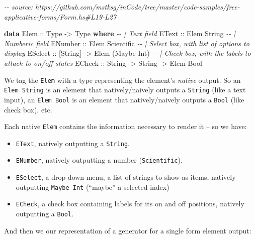 \documentclass[]{article}
\newenvironment{Shaded}{}{}
\newcommand{\CommentTok}[1]{\textcolor[rgb]{0.38,0.63,0.69}{\textit{#1}}}
\newcommand{\DataTypeTok}[1]{\textcolor[rgb]{0.56,0.13,0.00}{#1}}
\newcommand{\KeywordTok}[1]{\textcolor[rgb]{0.00,0.44,0.13}{\textbf{#1}}}
\newcommand{\NormalTok}[1]{#1}
\newcommand{\OtherTok}[1]{\textcolor[rgb]{0.00,0.44,0.13}{#1}}
\begin{document}
\begin{Shaded}
\begin{Highlighting}[]
\CommentTok{{-}{-} source: https://github.com/mstksg/inCode/tree/master/code{-}samples/free{-}applicative{-}forms/Form.hs\#L19{-}L27}

\KeywordTok{data} \DataTypeTok{Elem}\OtherTok{ ::} \DataTypeTok{Type} \OtherTok{{-}\textgreater{}} \DataTypeTok{Type} \KeywordTok{where}
    \CommentTok{{-}{-} | Text field}
    \DataTypeTok{EText}\OtherTok{   ::} \DataTypeTok{Elem} \DataTypeTok{String}
    \CommentTok{{-}{-} | Numberic field}
    \DataTypeTok{ENumber}\OtherTok{ ::} \DataTypeTok{Elem} \DataTypeTok{Scientific}
    \CommentTok{{-}{-} | Select box, with list of options to display}
    \DataTypeTok{ESelect}\OtherTok{ ::}\NormalTok{ [}\DataTypeTok{String}\NormalTok{] }\OtherTok{{-}\textgreater{}} \DataTypeTok{Elem}\NormalTok{ (}\DataTypeTok{Maybe} \DataTypeTok{Int}\NormalTok{)}
    \CommentTok{{-}{-} | Check box, with the labels to attach to on/off states}
    \DataTypeTok{ECheck}\OtherTok{  ::} \DataTypeTok{String} \OtherTok{{-}\textgreater{}} \DataTypeTok{String} \OtherTok{{-}\textgreater{}} \DataTypeTok{Elem} \DataTypeTok{Bool}
\end{Highlighting}
\end{Shaded}

We tag the \texttt{Elem} with a type representing the element's \emph{native}
output. So an \texttt{Elem\ String} is an element that natively/naively outputs
a \texttt{String} (like a text input), an \texttt{Elem\ Bool} is an element that
natively/naively outputs a \texttt{Bool} (like check box), etc.

Each native \texttt{Elem} contains the information necessary to render it -- so
we have:

\begin{itemize}
\tightlist
\item
  \texttt{EText}, natively outputting a \texttt{String}.
\item
  \texttt{ENumber}, natively outputting a number (\texttt{Scientific}).
\item
  \texttt{ESelect}, a drop-down menu, a list of strings to show as items,
  natively outputting \texttt{Maybe\ Int} (``maybe'' a selected index)
\item
  \texttt{ECheck}, a check box containing labels for its on and off positions,
  natively outputting a \texttt{Bool}.
\end{itemize}

And then we our representation of a generator for a single form element output:
\end{document}
